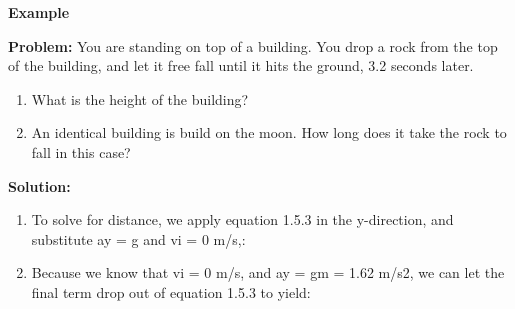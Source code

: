 \begin{mdframed}[backgroundcolor=blue!10!white]
	\begin{center}
		
		
		\textbf{Example \thesection}	
	\end{center}
	\vspace{0.1in}
	
	\textbf{Problem: } You are standing on top of a building.  You drop a rock  from the top of the building, and let it free fall until it hits the ground, 3.2 seconds later.  
	\begin{enumerate}[label=\alph*.]
		\item What is the height of the building?
		\item An identical building is build on the moon.  How long does it take the rock to fall in this case?
	\end{enumerate}

	\textbf{Solution:}
	\begin{enumerate}[label=\alph*.]
		\item To solve for distance, we apply equation 1.5.3 in the y-direction, and substitute ay = g and vi = 0 m/s,:
		
		\item Because we know that vi = 0 m/s, and ay = gm = 1.62 m/s2, we can let the final term drop out of equation 1.5.3 to yield:
	\end{enumerate}
\end{mdframed}




